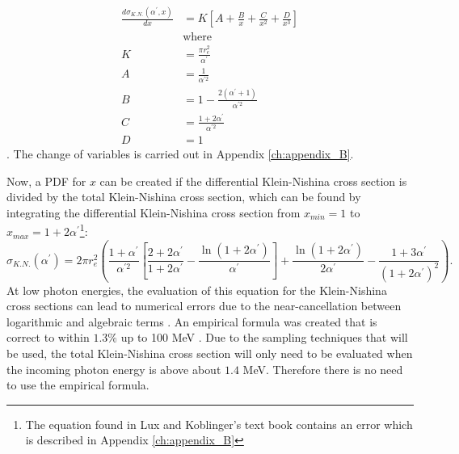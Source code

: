 \begin{align}
  \frac{d\sigma_{K.N.}(\alpha^{'},x)}{dx} & = K \left[ A + \frac{B}{x} +
    \frac{C}{x^2} + \frac{D}{x^3} \right] \\
  & \text{where} \nonumber \\
  K & = \frac{\pi r_e^2}{\alpha^{'}} \nonumber \\
  A & = \frac{1}{\alpha^{'2}} \nonumber \\
  B & = 1 - \frac{2(\alpha^{'} + 1)}{\alpha^{'2}} \nonumber \\
  C & = \frac{1 + 2\alpha^{'}}{\alpha^{'2}} \nonumber \\
  D & = 1 \nonumber
\end{align}
\citep{lux_monte_1991}. The change of variables is carried out in Appendix 
\ref{ch:appendix_B}.

Now, a PDF for $x$ can be created if the differential Klein-Nishina cross 
section is divided by the total Klein-Nishina cross section, which can be found 
by integrating the differential Klein-Nishina cross section from $x_{min} = 1$ to
$x_{max} = 1 + 2 \alpha^{'}$\footnote{The equation found in Lux and Koblinger's
text book contains an error which is described in Appendix \ref{ch:appendix_B}}:
\begin{equation}
  \sigma_{K.N.}(\alpha^{'}) = 2\pi r_e^2 \left( \frac{1+\alpha^{'}}{\alpha^{'2}}
  \left[\frac{2+2\alpha^{'}}{1+2\alpha^{'}} - 
    \frac{\ln{(1+2\alpha^{'})}}{\alpha^{'}} \right]
  + \frac{\ln{(1+2\alpha^{'})}}{2\alpha^{'}} - 
  \frac{1+3\alpha^{'}}{(1+2\alpha^{'})^2} \right).
\end{equation}
At low photon energies, the evaluation of this equation for the Klein-Nishina 
cross sections can lead to numerical errors due to the near-cancellation between
logarithmic and algebraic terms \citep{lux_monte_1991}. An empirical formula
was created that is correct to within $1.3\%$ up to 100 MeV
\citep{hastings_approximations_1955}. Due to the sampling techniques that will
be used, the total Klein-Nishina cross section will only need to be evaluated
when the incoming photon energy is above about $1.4$ MeV. Therefore there is no 
need to use the empirical formula.

